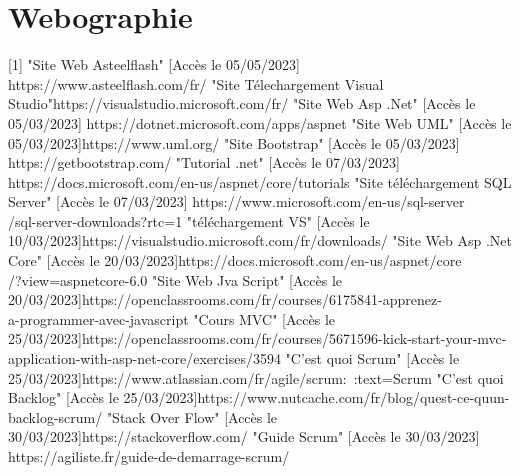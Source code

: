 \chapter*{Webographie}

[1] "Site Web Asteelflash" [Accès le 05/05/2023] \\ https://www.asteelflash.com/fr/ \newline
[2] "Site Télechargement Visual Studio"https://visualstudio.microsoft.com/fr/ \newline
[3] "Site Web Asp .Net" [Accès le 05/03/2023] https://dotnet.microsoft.com/apps/aspnet  \newline
[4] "Site Web UML" [Accès le 05/03/2023]https://www.uml.org/ \newline
[5] "Site Bootstrap" [Accès le 05/03/2023] https://getbootstrap.com/ \newline
[6] "Tutorial .net" [Accès le 07/03/2023] https://docs.microsoft.com/en-us/aspnet/core/tutorials  \newline
[7] "Site téléchargement SQL Server" [Accès le 07/03/2023] https://www.microsoft.com/en-us/sql-server\\/sql-server-downloads?rtc=1 \newline
[8] "téléchargement VS" [Accès le 10/03/2023]https://visualstudio.microsoft.com/fr/downloads/ \newline
[9] "Site Web Asp .Net Core" [Accès le 20/03/2023]https://docs.microsoft.com/en-us/aspnet/core\\/?view=aspnetcore-6.0 \newline
[10] "Site Web Jva Script" [Accès le 20/03/2023]https://openclassrooms.com/fr/courses/6175841-apprenez-\\a-programmer-avec-javascript  \newline
[11] "Cours MVC" [Accès le 25/03/2023]https://openclassrooms.com/fr/courses/5671596-kick-start-your-mvc-\\application-with-asp-net-core/exercises/3594 \newline
[12] "C'est quoi Scrum" [Accès le 25/03/2023]https://www.atlassian.com/fr/agile/scrum:~:text=Scrum \newline
[13] "C'est quoi Backlog" [Accès le 25/03/2023]https://www.nutcache.com/fr/blog/quest-ce-quun-backlog-scrum/  \newline
[14] "Stack Over Flow" [Accès le 30/03/2023]https://stackoverflow.com/ \newline
[15] "Guide Scrum" [Accès le 30/03/2023] https://agiliste.fr/guide-de-demarrage-scrum/ \newline
